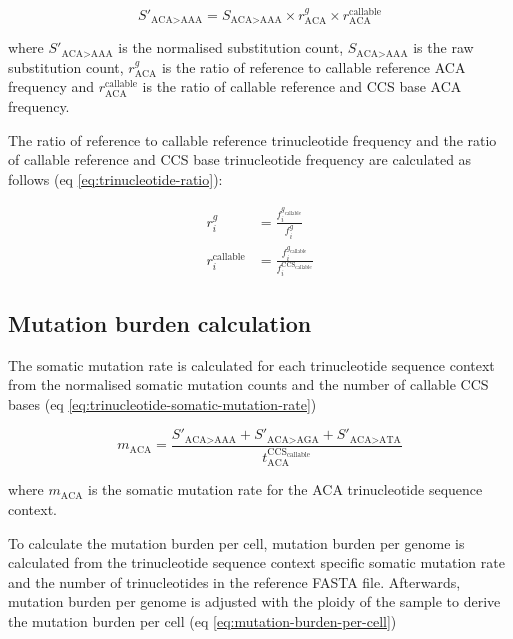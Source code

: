 \begin{equation} \label{eq:sbs96-normalisation}
S'_{\text{ACA>AAA}} = S_{\text{ACA>AAA}} \times r^{g}_{\text{ACA}} \times r^{\text{callable}}_{\text{ACA}} 
\end{equation}

where $S'_{\text{ACA>AAA}}$ is the normalised substitution count, $S_{\text{ACA>AAA}}$ is the raw substitution count, $r^{g}_{\text{ACA}}$ is the ratio of reference to callable reference ACA frequency and $r^{\text{callable}}_{\text{ACA}}$ is the ratio of callable reference and CCS base ACA frequency. 

The ratio of reference to callable reference trinucleotide frequency and the ratio of callable reference and CCS base trinucleotide frequency are calculated as follows (eq \ref{eq:trinucleotide-ratio}):

\begin{equation}
\begin{aligned} 
r^{g}_{i} &= \frac{f^{g_{\text{callable}}}_{i}}{f^{g}_{i}} \\[1em]
r^{\text{callable}}_{i} &= \frac{f^{g_{\text{callable}}}_{i}}{f^{\text{CCS}_{\text{callable}}}_{i}}
\end{aligned}
\label{eq:trinucleotide-ratio}
\end{equation}

\subsection{Mutation burden calculation}

The somatic mutation rate is calculated for each trinucleotide sequence context from the normalised somatic mutation counts and the number of callable CCS bases (eq \ref{eq:trinucleotide-somatic-mutation-rate})

\begin{equation} \label{eq:trinucleotide-somatic-mutation-rate}
m_{\text{ACA}} = \frac{S'_{\text{ACA>AAA}} + S'_{\text{ACA>AGA}} + S'_{\text{ACA>ATA}}}{t^{\text{CCS}_{\text{callable}}}_{\text{ACA}}} 
\end{equation}

where $m_{\text{ACA}}$ is the somatic mutation rate for the ACA trinucleotide sequence context. 

To calculate the mutation burden per cell, mutation burden per genome is calculated from the trinucleotide sequence context specific somatic mutation rate and the number of trinucleotides in the reference FASTA file. Afterwards, mutation burden per genome is adjusted with the ploidy of the sample to derive the mutation burden per cell (eq \ref{eq:mutation-burden-per-cell})

